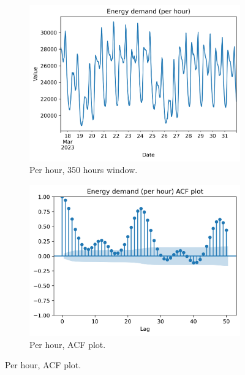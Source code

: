 \begin{figure}[H]
\centering
    \begin{subfigure}{.435\textwidth}
        \centering
        \includegraphics[width=1\linewidth]{images/variable_analysis/esios_demand_h_350}
        \caption{Per hour, 350 hours window.}
        \label{fig:demand-series-hour}
    \end{subfigure}
    \begin{subfigure}{.45\textwidth}
        \centering
        \includegraphics[width=1\linewidth]{images/variable_analysis/esios_demand_h_acf}
        \caption{Per hour, ACF plot.}
        \label{fig:demand-series-hour-acf}
    \end{subfigure}
\end{figure}

